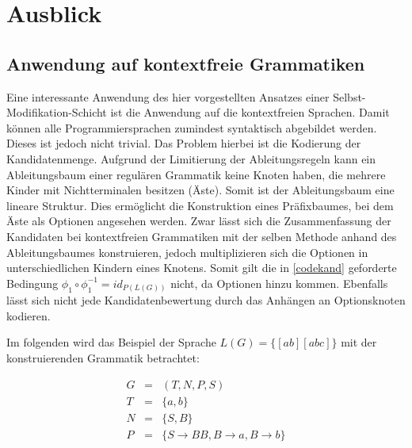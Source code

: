 \documentclass[a4paper,12pt]{report}
\begin{document}

\newpage
\thispagestyle{empty}
\mbox{}
\newpage
\thispagestyle{empty}
\mbox{}


\chapter{Ausblick}
\label{ausblick}




\section{Anwendung auf kontextfreie Grammatiken}

Eine interessante Anwendung des hier vorgestellten Ansatzes einer Selbst-Modifikation-Schicht ist die Anwendung auf die kontextfreien Sprachen. Damit können alle Programmiersprachen zumindest syntaktisch abgebildet werden. Dieses ist jedoch nicht trivial. Das Problem hierbei ist die Kodierung der Kandidatenmenge. Aufgrund der Limitierung der Ableitungsregeln kann ein Ableitungsbaum einer regulären Grammatik keine Knoten haben, die mehrere Kinder mit Nichtterminalen besitzen (Äste). Somit ist der Ableitungsbaum eine lineare Struktur. Dies ermöglicht die Konstruktion eines Präfixbaumes, bei dem Äste als Optionen angesehen werden. 
Zwar lässt sich die Zusammenfassung der Kandidaten bei kontextfreien Grammatiken mit der selben Methode anhand des Ableitungsbaumes konstruieren, jedoch multiplizieren sich die Optionen in unterschiedlichen Kindern eines Knotens. Somit gilt die in \ref{codekand} geforderte Bedingung $\phi_1\circ\phi_1^{-1} = id_{P(L(G))}$ nicht, da Optionen hinzu kommen. Ebenfalls lässt sich nicht jede Kandidatenbewertung durch das Anhängen an Optionsknoten kodieren.

Im folgenden wird das Beispiel der Sprache $L(G) = \{ [ab][abc] \}$ mit der konstruierenden Grammatik betrachtet: 

\begin{eqnarray}
  G &=& (T,N,P,S)\\
  T &=& \{ a, b \}\\
  N &=& \{ S, B \} \\
  P &=& \{ S\rightarrow BB, B\rightarrow a, B\rightarrow b\}
\end{eqnarray}
\end{document}
